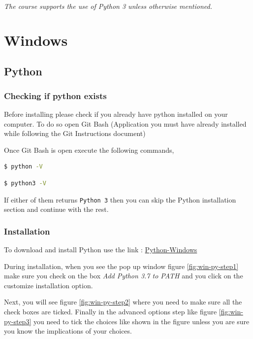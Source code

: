 \documentclass{cmc}
\begin{document}
\textbf{}\textit{The course supports the use of Python 3
  unless otherwise mentioned.}

\section{Windows}
\label{sec:windows}

\subsection{Python}
\label{sec:python-win}
\subsubsection{Checking if python exists}
\label{sec-win:checking-if-python}
Before installing please check if you already have python installed on
your computer.  To do so open Git Bash (Application you must have
already installed while following the Git Instructions document)

Once Git Bash is open execute the following commands,

\begin{lstlisting}[language=bash]
$ python -V
\end{lstlisting}
\begin{lstlisting}[language=bash]
$ python3 -V
\end{lstlisting}

If either of them returns \verb|Python 3| then you can skip the Python
installation section and continue with the rest.

\subsubsection{Installation}
\label{sec-win:installation-python}

To download and install Python use the link :
\href{https://www.python.org/downloads/windows/}{Python-Windows}

During installation, when you see the pop up window figure
 \ref{fig:win-py-step1} make sure you check on the box \textit{Add
  Python 3.7 to PATH} and you click on the customize installation
option.

Next, you will see figure \ref{fig:win-py-step2} where you need to make sure
all the check boxes are ticked. Finally in the advanced options step
like figure \ref{fig:win-py-step3} you need to tick the choices like shown in
the figure unless you are sure you know the implications of your
choices.
\end{document}
